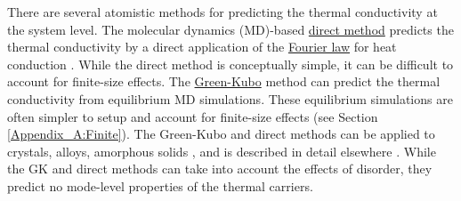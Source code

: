
There are several atomistic methods for predicting the thermal 
conductivity at the system level. The molecular dynamics (MD)-based 
\href{http://lammps.sandia.gov/doc/fix_thermal_conductivity.html}
{direct method} predicts the thermal conductivity by a direct 
application of the 
\href{http://en.wikipedia.org/wiki/Thermal_conduction#Fourier.27s_law}
{Fourier law} for heat conduction 
\cite{skye_thermal_2008,landry_complex_2008,
landry_effect_2009,landry_thermal_2009,
turney_predicting_2009,thomas_thermal_2010}. 
While the direct method 
is conceptually simple, it can be difficult to account for finite-size 
effects. The 
\href{http://lammps.sandia.gov/doc/compute_heat_flux.html}{Green-Kubo}
method can predict the thermal conductivity from equilibrium MD 
simulations. These equilibrium simulations are often simpler 
to setup and account for finite-size effects 
(see Section \ref{Appendix_A:Finite}).  
The Green-Kubo and direct methods can be applied to crystals, alloys, 
amorphous solids 
\cite{mcgaughey_quantitative_2004,mcgaughey_thermal_2004,
landry_complex_2008,he_lattice_2012,
he_heat_2011,he_morphology_2011,he_thermal_2011,turney_predicting_2009,
landry_complex_2008,shiomi_thermal_2011,esfarjani_heat_2011}, 
and is described in detail elsewhere 
\cite{mcquarrie_statistical_2000,mcgaughey_phonon_2004}.
While the GK and direct methods can take into 
account the effects of disorder, 
they predict no mode-level 
properties of the thermal carriers. 

